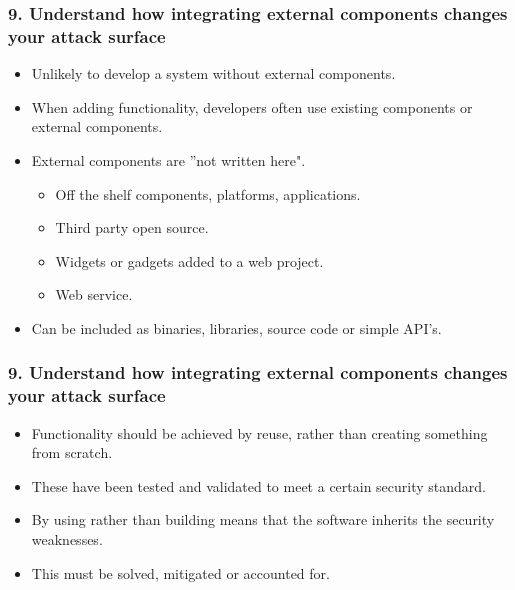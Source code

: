\documentclass[12pt,norsk]{beamer}
\begin{document}
\begin{frame}

	\frametitle{9. Understand how integrating external components changes your attack surface}
	
	\begin{itemize}
		\item Unlikely to develop a system without external components.
		\item When adding functionality, developers often use existing components or external components.
		\item External components are ''not written here".
		\begin{itemize}
			\item Off the shelf components, platforms, applications.
			\item Third party open source.
			\item Widgets or gadgets added to a web project.
			\item Web service.
		\end{itemize}
		\item Can be included as binaries, libraries, source code or simple API's.
	\end{itemize}
\end{frame}

\begin{frame}

	\frametitle{9. Understand how integrating external components changes your attack surface}
	
	\begin{itemize}
		\item Functionality should be achieved by reuse, rather than creating something from scratch.
		\item These have been tested and validated to meet a certain security standard.
		\item By using rather than building means that the software inherits the security weaknesses.
		\item This must be solved, mitigated or accounted for.
	\end{itemize}
	

\end{frame}
\end{document}
